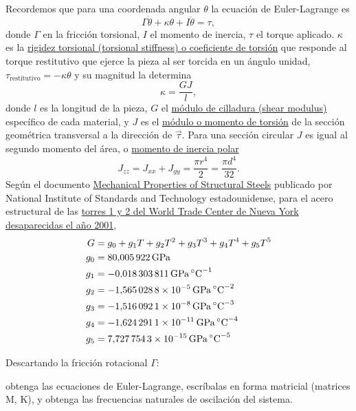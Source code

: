 \documentclass[11pt, spanish, a4paper, twopage]{article}
\begin{document}
\begin{enumerate}
Recordemos que para una coordenada angular \(\theta\) la ecuación de Euler-Lagrange es
\[
	\Gamma \dot{\theta} + \kappa \theta + I \ddot{\theta} = \tau,
\]
donde \(\Gamma\) en la fricción torsional, \(I\) el momento de inercia, \(\tau\) el torque aplicado.
$\kappa$ es la \href{https://es.wikipedia.org/wiki/Resorte_de_torsi%C3%B3n#Coeficiente_de_torsi%C3%B3n}{rigidez torsional (torsional stiffness) o coeficiente de torsión} que responde al torque restitutivo que ejerce la pieza al ser torcida en un ángulo unidad, $\tau_\text{restitutivo} = - \kappa \theta$ y su magnitud la determina 
\[
	\kappa = \frac{G J}{l},
\]
donde \(l\) es la longitud de la pieza, \(G\) el \href{https://es.wikipedia.org/wiki/M%C3%B3dulo_de_cizalladura}{módulo de cilladura (shear modulus)} específico de cada material, y \(J\) es el \href{https://es.wikipedia.org/wiki/Módulo_de_torsión}{módulo o momento de torsión} de la sección geométrica transversal a la dirección de $\vec{\tau}$.
Para una sección circular \(J\) es igual al segundo momento del área, o \href{https://es.wikipedia.org/wiki/Segundo_momento_de_%C3%A1rea}{momento de inercia polar}
\[
	J_{zz} = J_{xx} + J_{yy} = \frac{\pi r^4}{2} = \frac{\pi d^4}{32}.
\]
Según el documento \href{https://tsapps.nist.gov/publication/get_pdf.cfm?pub_id=101021}{Mechanical Properties of Structural Steels} publicado por National Institute of Standards and Technology estadounidense, para el acero estructural de las \href{https://es.wikipedia.org/wiki/World_Trade_Center_(1973-2001)}{torres 1 y 2 del World Trade Center de Nueva York desaparecidas el año 2001},
\[
	\begin{aligned}
		G &= g_0 + g_1 T + g_2 T^2 + g_3 T^3 + g_4 T^4 + g_5 T^5\\
		g_0 &= \SI{80.005922}{\giga\pascal}\\
		g_1 &= \SI{-0.018303811}{\giga\pascal\per\celsius}\\
		g_2 &= \SI{-1.5650288E-5}{\giga\pascal\per\celsius\tothe{2}}\\
		g_3 &= \SI{-1.5160921E-8}{\giga\pascal\per\celsius\tothe{3}}\\
		g_4 &= \SI{-1.6242911E-11}{\giga\pascal\per\celsius\tothe{4}}\\
		g_5 &= \SI{7.7277543E-15}{\giga\pascal\per\celsius\tothe{5}}
	\end{aligned}
\]

Descartando la fricción rotacional \(\Gamma\):
\begin{tasks}
	\task obtenga las ecuaciones de Euler-Lagrange,
	\task escríbalas en forma matricial (matrices M, K), y
	\task obtenga las frecuencias naturales de oscilación del sistema.
\end{tasks}



\end{enumerate}
\end{document}
